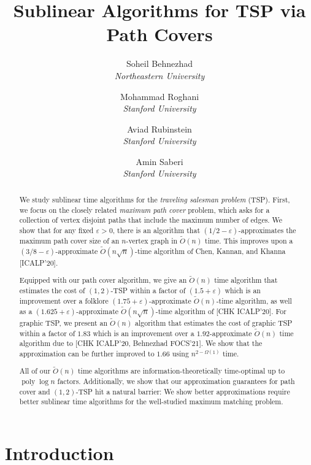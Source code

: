 \documentclass[letterpaper,11pt]{article}
\title{Sublinear Algorithms for TSP via Path Covers}
\author{
 Soheil Behnezhad\\{\em Northeastern University} \and 
 Mohammad Roghani\\{\em Stanford University} \and
 Aviad Rubinstein\\{\em Stanford University} \and
 Amin Saberi\\{\em Stanford University}
 }
\date{}
\renewcommand{\epsilon}{\varepsilon}
\DeclareMathOperator{\poly}{poly}
\begin{document}
\maketitle

\begin{abstract}
We study sublinear time algorithms for the {\em traveling salesman problem} (TSP). First, we focus on the closely related {\em maximum path cover} problem, which asks for a collection of vertex disjoint paths that include the maximum number of edges. We show that for any fixed $\epsilon > 0$, there is an algorithm that $(1/2 - \epsilon)$-approximates the maximum path cover size of an $n$-vertex graph in $\widetilde{O}(n)$ time. This improves upon a $(3/8-\epsilon)$-approximate $\widetilde{O}(n \sqrt{n})$-time algorithm of Chen, Kannan, and Khanna [ICALP'20].
    
    \medskip
    Equipped with our path cover algorithm, we give an $\widetilde{O}(n)$ time algorithm that estimates the cost of $(1,2)$-TSP within a factor of $(1.5+\epsilon)$ which is an improvement over a folklore $(1.75 + \epsilon)$-approximate $\widetilde{O}(n)$-time algorithm, as well as a $(1.625+\epsilon)$-approximate $\widetilde{O}(n\sqrt{n})$-time algorithm of [CHK ICALP'20]. For graphic TSP, we present an $\widetilde{O}(n)$ algorithm that estimates the cost of graphic TSP within a factor of $1.83$ which is an improvement over a $1.92$-approximate $\widetilde{O}(n)$ time algorithm due to [CHK ICALP'20, Behnezhad FOCS'21]. We show that the approximation can be further improved to $1.66$ using $n^{2-\Omega(1)}$ time.
    
    \medskip    
    All of our $\widetilde{O}(n)$ time algorithms are information-theoretically time-optimal up to $\poly\log n$ factors. Additionally, we show that our approximation guarantees for path cover and $(1,2)$-TSP hit a natural barrier: We show better approximations require better sublinear time algorithms for the well-studied maximum matching problem.
\end{abstract}

\clearpage

\setcounter{tocdepth}{2}
\tableofcontents
\thispagestyle{empty}

\clearpage

\setcounter{page}{1}

\section{Introduction}
\end{document}
